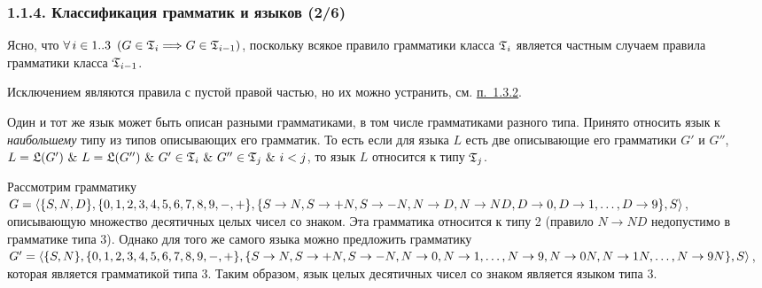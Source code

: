 \documentclass[mathserif,12pt,aspectratio=169]{beamer}
\def\emразделенной{\em разделенной}
\def\em#1{\it\color{blue}#1}
\def\A#1#2{\forall\,#1\ \left(#2\right)}
\let\Impl\Longrightarrow
\def\And{\operatorname{\,\&\,}}
\def\DMref#1#2{{\color{blue}\underline{\hyperlink{#2}{#1}}}}
\begin{document}
\begin{frame}
\frametitle{1.1.4. Классификация грамматик и языков (2/6)}
Ясно, что $\A{i\in 1..3}{G\in \frak{T}_i\Impl G\in \frak{T}_{i-1}}$, поскольку всякое правило
грамматики класса $\frak{T}_i$ 
является частным случаем 
правила грамматики класса $\frak{T}_{i-1}$.

\begin{remark}
Исключением являются правила с пустой правой частью,
но их можно устранить, см. \DMref{п.~1.3.2}{1.3.2.}.
\end{remark}
\medskip
Один и тот же язык может быть описан разными грамматиками, в том
числе грамматиками разного типа. Принято относить язык к
{\em наибольшему} типу из типов описывающих его грамматик. То есть если
для языка $L$ есть две описывающие его грамматики $G'$ и $G''$,
$L=\frak{L}(G')\And L=\frak{L}(G'')\And G'\in \frak{T}_i\And G''\in \frak{T}_j\And i<j$, то
язык $L$ относится к типу $\frak{T}_j$.
\begin{example}
Рассмотрим грамматику
$G=\langle\{S,N,D\},\{0,1,2,3,4,5,6,7,8,9,-,+\},
\linebreak
\{S\rightarrow
N, S\rightarrow
+N, S\rightarrow
-N, N\rightarrow D, N\rightarrow ND, D\rightarrow 0, D\rightarrow 1,\ldots,D\rightarrow 9 \}, S\rangle$, описывающую множество десятичных целых чисел со знаком.
Эта грамматика относится к типу 2 (правило $N\rightarrow ND$
недопустимо в грамматике типа 3). Однако для того же самого языка
можно предложить грамматику
$G'=\langle\{S,N\},\{0,1,2,3,4,5,6,7,8,9,-,+\},
\linebreak
\{S\rightarrow N, 
S\rightarrow +N, 
S\rightarrow -N, 
N\rightarrow 0,
N\rightarrow 1,
\ldots,
N\rightarrow 9,
N\rightarrow 0N,
N\rightarrow 1N,
\ldots,\linebreak
N\rightarrow 9N
\}, S \rangle$,
которая является грамматикой типа 3. Таким образом, язык целых
десятичных чисел со знаком является языком типа 3.
\end{example}

\end{frame}
\end{document}
